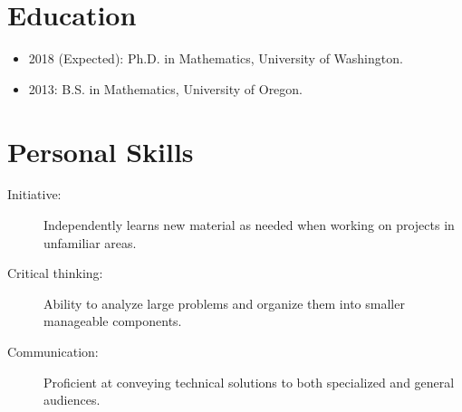 \documentclass{article}
\begin{document}
	\section{Education}
	
	\begin{itemize}  
		\item 2018 (Expected): Ph.D. in Mathematics, University of Washington.
		\item 2013: B.S. in Mathematics, University of Oregon.
	\end{itemize}
	\section{Personal Skills}
	
	\begin{description}
		\item[Initiative:] Independently learns new material as needed when working on projects in unfamiliar areas.
		\item[Critical thinking:] Ability to analyze large problems and organize them into smaller manageable components.
		\item[Communication:] Proficient at conveying technical solutions to both specialized and general audiences.
	\end{description}

	
\end{document}
